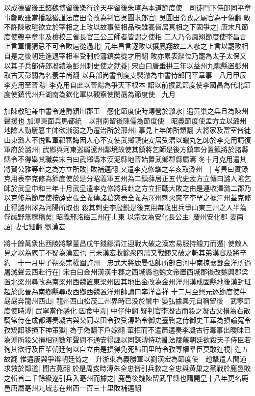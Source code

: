 以成德留後王鎔魏博留後樂行達天平留後朱瑄為本道節度使　司徒門下侍郎同平章事鄭畋雖當播越猶謹法度田令孜為判官吳圓求郎官|{
	吳圓田令孜之屬官為于偽翻}
畋不許陳敬瑄欲立於宰相之上畋以故事使相品秩雖高皆居真相之下固爭之|{
	唐末凡節度使帶平章事及檢校三省長官三公三師者皆謂之使相}
二人乃令鳳翔節度使李昌言上言軍情猜忌不可令畋扈從過北|{
	元年昌言逐畋以攘鳳翔故二人嗾之上言以罷畋相自是之後朝廷進退宰相率受制於藩鎮矣從才用翻}
畋亦累表辭位乃罷為太子太保又以其子兵部侍郎凝績為彭州刺史使之就養|{
	宋白曰唐垂拱三年以益州九隴縣置彭州取古天彭關為名養羊尚翻}
以兵部尚書判度支裴澈為中書侍郎同平章事　八月甲辰李克用至晉陽|{
	李克用自此以晉陽為爭天下根本}
詔以前振武節度使李國昌為代北節度使鎮代州升湖南為欽化軍以觀察使閔勗為節度使　九月

加陳敬瑄兼中書令進爵潁川郡王　感化節度使時溥營於溵水|{
	遏黄巢之兵且為陳州聲援也}
加溥東面兵馬都統　以荆南留後陳儒為節度使　昭義節度使孟方立以潞州地險人勁屢簒主帥欲漸弱之乃遷治所於邢州|{
	事見上年帥所類翻}
大將家及富室皆徙山東潞人不悦監軍祁審誨因人心不安使武鄉鎮使安居受潜以蠟丸乞師於李克用請復軍府於潞州|{
	武鄉與河東巡屬遼州鄰境故使其鎮將乞師是後方鎮率分置鎮將於諸縣縣令不得舉其職矣宋白曰武鄉縣本漢泥縣地晉始置武鄉郡縣屬焉}
冬十月克用遣其將賀公雅等赴之為方立所敗|{
	敗補邁翻}
又遣李克修擊之辛亥取潞州　|{
	考異曰實録克用表李克修為節度使於是分昭義軍五州為二鎮薛居正五代史孟方立傳曰潞人隂乞師於武皇中和三年十月武皇遣李克修將兵赴之方立拒戰大敗之由是連收澤潞二郡乃以克修為節度使按薛史張全義傳諸葛爽表全義為澤州刺火爽卒李罕之據澤州蓋克修止得潞州澤為河陽所取也}
殺其刺史李殷鋭是後克用每歲出兵爭山東三州之人半為俘馘野無稼穡矣|{
	昭義邢洺磁三州在山東}
以宗女為安化長公主|{
	慶州安化郡}
妻南詔|{
	妻七細翻}
劉漢宏

將十餘萬衆出西陵將擊董昌戊午錢鏐濟江迎戰大破之漢宏易服持鱠刀而遁|{
	使敵人見之以為庖丁不疑為漢宏也}
己未漢宏收餘衆四萬又戰鏐又破之斬其弟漢容及將辛約　十一月甲子朔秦宗權圍許州　忠武大將鹿晏弘帥所部自河中南掠襄鄧金洋所過屠滅聲云西赴行在|{
	宋白曰金州漢漢中郡之西城縣也魏文帝置西城郡後改魏興郡梁置北梁州尋改為南梁州西魏置東梁州因其地出金改為金州洋州漢成固縣地後漢封班超於此晉為南鄉縣尋改西鄉西魏置洋州帥讀曰率洋音祥}
十二月至興元逐節度使牛勗勗奔龍州西山|{
	龍州西山松茂二州界時已没於蠻中}
晏弘據興元自稱留後　武寧節度使時溥|{
	武寧當作感化}
因食中毒|{
	中仔仲翻}
疑判官李凝古而殺之凝古父損為右散騎常侍在成都溥奏凝古與父同謀田令孜受溥賂令御史臺鞫之侍御史王華為損論寃令孜矯詔移損下神策獄|{
	為于偽翻下戶嫁翻}
華拒而不遣蕭遘奏李凝古行毒事出曖昧已為溥所殺父損相别數年聲問不通安得誣以同謀溥恃功亂法陵蔑朝廷欲殺天子侍臣若徇其欲行及臣輩朝廷何以自立由是損得免死歸田里時令孜專權羣臣莫敢迕視|{
	迕五故翻}
惟遘屢與爭辯朝廷倚之　升浙東為義勝軍以劉漢宏為節度使　趙犨遣人間道求救於鄰道|{
	聞古莧翻}
於是周岌時溥朱全忠皆引兵救之全忠與黄巢之黨戰於鹿邑敗之斬首二千餘級遂引兵入亳州而據之|{
	鹿邑後魏陳留武平縣也隋開皇十八年更名鹿邑唐屬亳州九域志在州西一百三十里敗補邁翻}


